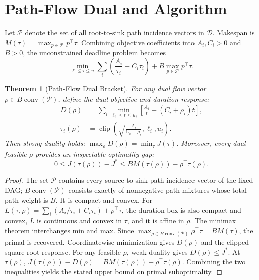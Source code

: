\documentclass[10pt,letterpaper,journal]{IEEEtran}
\newtheorem{theorem}{Theorem}
\begin{document}
\section{Path-Flow Dual and Algorithm}
Let $\mathcal{P}$ denote the set of all root-to-sink path incidence vectors in $\mathcal{D}$. Makespan is $M(\tau) = \max_{p \in \mathcal{P}} p^\top \tau$. Combining objective coefficients into $A_i, C_i > 0$ and $B > 0$, the unconstrained deadline problem becomes
\begin{equation}
\min_{\ell \le \tau \le u} \sum_i \left( \frac{A_i}{\tau_i} + C_i \tau_i \right) + B \max_{p \in \mathcal{P}} p^\top \tau.
\end{equation}

\begin{theorem}[Path-Flow Dual Bracket]\label{th:dual}
For any dual flow vector $\rho \in B \operatorname{conv}(\mathcal{P})$, define the dual objective and duration response:
\begin{align}
D(\rho) &= \sum_i \min_{\ell_i \le t \le u_i} \left[ \frac{A_i}{t} + (C_i + \rho_i)t \right],\\
\tau_i(\rho) &= \operatorname{clip}\left( \sqrt{\frac{A_i}{C_i + \rho_i}}, \ell_i, u_i \right).
\end{align}
Then strong duality holds: $\max_\rho D(\rho) = \min_\tau J(\tau)$. Moreover, every dual-feasible $\rho$ provides an inspectable optimality gap:
\begin{equation}
0 \le J(\tau(\rho)) - J^* \le B M(\tau(\rho)) - \rho^\top \tau(\rho).
\end{equation}
\end{theorem}
\begin{proof}
The set $\mathcal P$ contains every source-to-sink path incidence vector of the fixed DAG; $B\operatorname{conv}(\mathcal P)$ consists exactly of nonnegative path mixtures whose total path weight is $B$. It is compact and convex. For $L(\tau,\rho)=\sum_i(A_i/\tau_i+C_i\tau_i)+\rho^\top\tau$, the duration box is also compact and convex, $L$ is continuous and convex in $\tau$, and it is affine in $\rho$. The minimax theorem interchanges min and max. Since $\max_{\rho\in B\operatorname{conv}(\mathcal P)}\rho^\top\tau=B M(\tau)$, the primal is recovered. Coordinatewise minimization gives $D(\rho)$ and the clipped square-root response. For any feasible $\rho$, weak duality gives $D(\rho)\le J^*$. At $\tau(\rho)$, $J(\tau(\rho))-D(\rho)=B M(\tau(\rho))-\rho^\top\tau(\rho)$. Combining the two inequalities yields the stated upper bound on primal suboptimality.
\end{proof}
\end{document}

